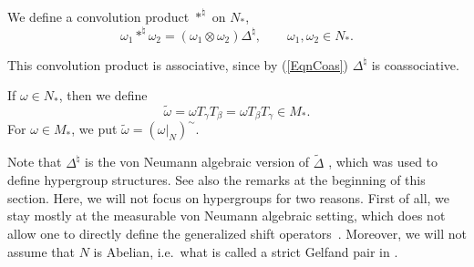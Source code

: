 \begin{dfn}
 We def\/ine a convolution product $\ast^\natural$ on $N_\ast$,
\[
\omega_1 \ast^\natural \omega_2 = (\omega_1 \otimes \omega_2) \Delta^\natural, \qquad  \omega_1, \omega_2 \in N_\ast.
\]
\end{dfn}

This convolution product is associative, since by (\ref{EqnCoas}) $\Delta^\natural$ is coassociative.

\begin{dfn}
If $\omega \in N_\ast$, then we def\/ine
\[
\tilde{\omega} = \omega T_\gamma  T_\beta = \omega T_\beta T_\gamma \in M_\ast.
\]
 For $\omega \in M_\ast$, we put $\tilde{\omega} = (\omega \vert_N)^\sim$.
\end{dfn}


\begin{rmk}
Note that $\Delta^\natural$ is the von Neumann algebraic version of $\tilde{\Delta}$ \cite{VaiHyp}, which was used to def\/ine hypergroup structures. See also the remarks at the beginning of this section. Here, we will not focus on hypergroups for two reasons. First of all, we stay mostly at the measurable von Neumann algebraic setting, which does not allow one to directly def\/ine the generalized shift operators~\cite{VaiHyp}. Moreover, we will not assume that $N$ is Abelian, i.e.\ what is called a strict Gelfand pair in \cite{VaiHyp}.
\end{rmk}

